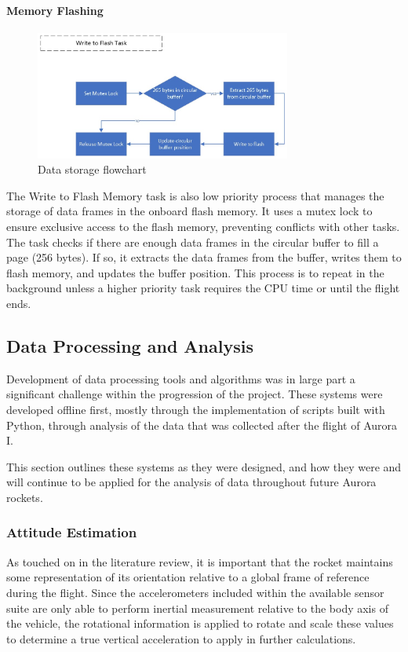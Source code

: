 \paragraph{Memory Flashing}
\begin{figure}[ht!]
  \begin{center}
    \hspace{-1.5cm}\includegraphics[width=0.75\textwidth]{./img/Section_4_2_2_5.jpeg}
  \end{center}
  \caption{Data storage flowchart}\label{fig:flowchart-flash}
\end{figure}

The Write to Flash Memory task is also low priority process that manages the storage of data frames in the onboard flash memory. It uses a mutex lock to ensure exclusive access to the flash memory, preventing conflicts with other tasks. The task checks if there are enough data frames in the circular buffer to fill a page (256 bytes). If so, it extracts the data frames from the buffer, writes them to flash memory, and updates the buffer position. This process is to repeat in the background unless a higher priority task requires the CPU time or until the flight ends.  

\subsection{Data Processing and Analysis}
Development of data processing tools and algorithms was in large part a significant challenge within the progression of the project. These systems were developed offline first, mostly through the implementation of scripts built with Python, through analysis of the data that was collected after the flight of Aurora I. 

This section outlines these systems as they were designed, and how they were and will continue to be applied for the analysis of data throughout future Aurora rockets.

\subsubsection{Attitude Estimation}
As touched on in the literature review, it is important that the rocket maintains some representation of its orientation relative to a global frame of reference during the flight. Since the accelerometers included within the available sensor suite are only able to perform inertial measurement relative to the body axis of the vehicle, the rotational information is applied to rotate and scale these values to determine a true vertical acceleration to apply in further calculations.

